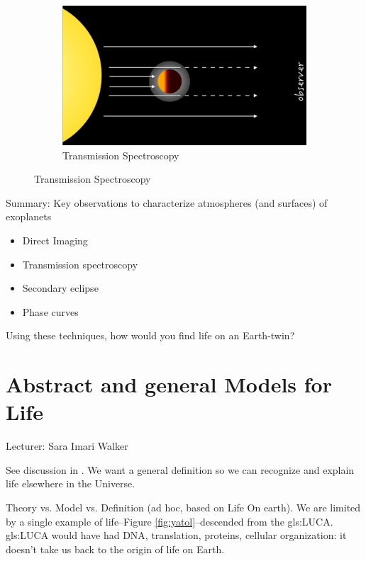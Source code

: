 \documentclass[]{article}
\begin{document}
\begin{figure}[H]
\begin{subfigure}[t]{0.3\textwidth}
	\end{subfigure}
	\begin{subfigure}[t]{0.3\textwidth}
		\caption{Transmission Spectroscopy}\label{fig:transiting:planets3}
		\includegraphics[width=\textwidth]{TransitingPlanets3}
	\end{subfigure}
\end{figure}
	

Summary: Key observations to characterize atmospheres (and surfaces) of exoplanets
\begin{itemize}
	\item Direct Imaging
	\item  Transmission spectroscopy
	\item  Secondary eclipse
	\item  Phase curves
\end{itemize}
Using these techniques, how would you find life on an Earth-twin?

\cite{sagan1993search}
\cite{kaltenegger2017characterize}
\cite{fujii2018exoplanet}

\cite{robinson2011earth}

\cite{deming2013infrared}
\cite{knutson2007map}



\section{Abstract and general Models for Life}

Lecturer: Sara Imari Walker

See discussion in \cite{trifonov2011vocabulary}. We want a general definition so we can recognize and explain life elsewhere in the Universe.

Theory vs. Model vs. Definition (ad hoc, based on Life On earth). We are limited by a single example of life--Figure \ref{fig:yatol}--descended from the \gls{gls:LUCA}. \gls{gls:LUCA} would have had DNA, translation, proteins, cellular organization: it doesn't take us back to the origin of life on Earth.
\end{document}
